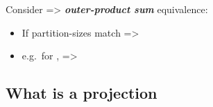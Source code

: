 Consider
=> \textbf{\emph{outer-product sum}} equivalence:
\begin{itemize}
  \item
        If partition-sizes match =\textgreater{}
  \item
        e.g.~for ,
         =\textgreater{}
\end{itemize}

\subsection*{What is a projection}

